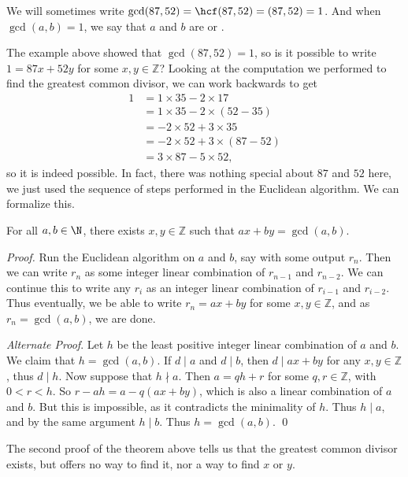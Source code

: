 \documentclass[a4paper]{scrartcl}
\begin{document}
\begin{notation}
	We will sometimes write $\gcd(87, 52) = \hcf(87, 52) = (87, 52) = 1$. And when $\gcd(a, b) = 1$, we say that $a$ and $b$ are  or .
\end{notation}

The example above showed that $\gcd(87, 52) = 1$, so is it possible to write $1 = 87x + 52y$ for some $x,y \in \mathbb{Z}$?
Looking at the computation we performed to find the greatest common divisor, we can work backwards to get
\begin{align*}
	1 &= 1 \times 35 - 2 \times 17 \\
	  &= 1 \times 35 - 2 \times (52 - 35) \\
	  &= -2 \times 52 + 3 \times 35 \\
	  &= -2\times 52 + 3 \times (87 - 52) \\
	  &= 3\times 87 - 5 \times 52,
\end{align*}
so it is indeed possible. In fact, there was nothing special about $87$ and $52$ here, we just used the sequence of steps performed in the Euclidean algorithm. We can formalize this.

\begin{theorem}
	For all $a, b \in \N$, there exists $x, y \in \mathbb{Z}$ such that $ax + by = \gcd(a, b)$.
\end{theorem}
\begin{proof} 
	Run the Euclidean algorithm on $a$ and $b$, say with some output $r_n$. Then we can write $r_n$ as some integer linear combination of $r_{n - 1}$ and $r_{n - 2}$.
	We can continue this to write any $r_i$ as an integer linear combination of $r_{i - 1}$ and $r_{i - 2}$. Thus eventually, we be able to write $r_n = ax + by$ for some $x, y \in \mathbb{Z}$, and as $r_n = \gcd(a, b)$, we are done. \hfill \qedhere

	\emph{Alternate Proof}. Let $h$ be the least positive integer linear combination of $a$ and $b$. We claim that $h = \gcd(a, b)$. If $d \mid a$ and $d \mid b$, then $d \mid ax + by$ for any $x, y \in \mathbb{Z}$, thus $d \mid h$. Now suppose that $h \nmid a$. Then $a = qh + r$ for some $q, r \in \mathbb{Z}$, with $0 < r < h$. So $r - ah = a - q(ax + by)$, which is also a linear combination of $a$ and $b$. But this is impossible, as it contradicts the minimality of $h$. Thus $h \mid a$, and by the same argument $h \mid b$. Thus $h = \gcd(a, b)$. \hfill \qed
\end{proof}

\begin{remark}
	The second proof of the theorem above tells us that the greatest common divisor exists, but offers no way to find it, nor a way to find $x$ or $y$. 
\end{remark}
\end{document}
